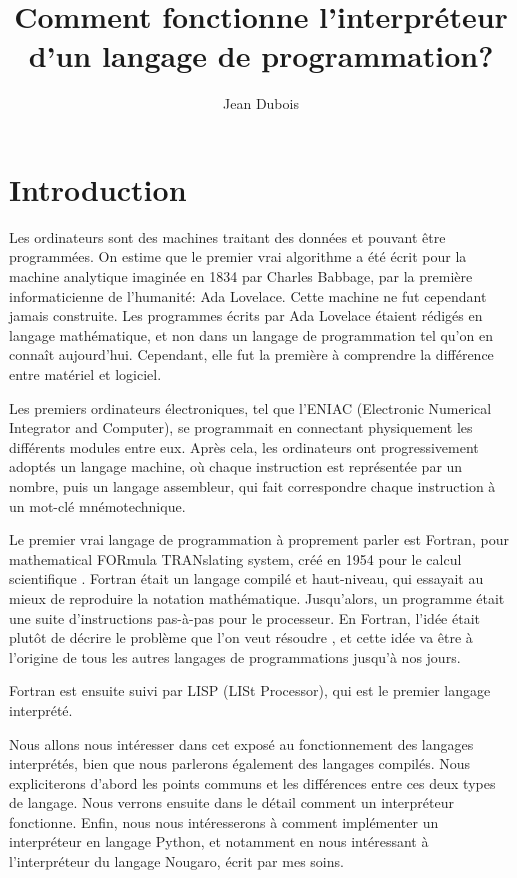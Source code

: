 \documentclass{article}
\title{Comment fonctionne l’interpréteur d’un langage de programmation\nobreakspace?}
\author{Jean Dubois}
\begin{document}
\maketitle

\section{Introduction}
Les ordinateurs sont des machines traitant des données et pouvant être programmées.
On estime que le premier vrai algorithme a été écrit pour la machine analytique imaginée
en 1834 par Charles Babbage, par la première informaticienne de l’humanité\nobreakspace:
Ada Lovelace. Cette machine ne fut cependant jamais construite. Les programmes écrits par
Ada Lovelace étaient rédigés en langage mathématique, et non dans un langage de programmation
tel qu’on en connaît aujourd’hui. Cependant, elle fut la première à comprendre la différence
entre matériel et logiciel. \cite[p. 454]{berry}

Les premiers ordinateurs électroniques, tel que l’ENIAC (Electronic Numerical Integrator and Computer),
se programmait en connectant physiquement les différents modules entre eux. \cite{britannica-eniac}
Après cela, les ordinateurs ont progressivement adoptés un langage machine, où chaque instruction est
représentée par un nombre, puis un langage assembleur, qui fait correspondre chaque instruction à
un mot-clé mnémotechnique. \cite{britannica-asm}

Le premier vrai langage de programmation à proprement parler est Fortran, pour mathematical
FORmula TRANslating system, créé en 1954 pour le calcul scientifique \cite[p. 455]{berry}.
Fortran était un langage compilé et haut-niveau, qui essayait au mieux de reproduire la
notation mathématique. Jusqu’alors, un programme était une suite d’instructions pas-à-pas pour
le processeur. En Fortran, l’idée était plutôt de décrire le problème que l’on veut résoudre 
\cite{imb-john-backus}, et cette idée va être à l’origine de tous les autres langages de
programmations jusqu’à nos jours.

Fortran est ensuite suivi par LISP (LISt Processor), qui est le premier langage interprété.

Nous allons nous intéresser dans cet exposé au fonctionnement des langages interprétés,
bien que nous parlerons également des langages compilés. Nous expliciterons d’abord les
points communs et les différences entre ces deux types de langage. Nous verrons ensuite
dans le détail comment un interpréteur fonctionne. Enfin, nous nous intéresserons à
comment implémenter un interpréteur en langage Python, et notamment en nous intéressant
à l’interpréteur du langage Nougaro, écrit par mes soins.
\end{document}
